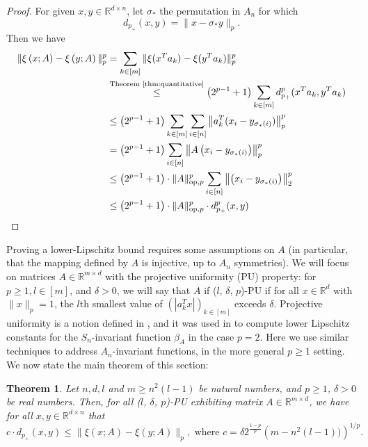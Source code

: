 \documentclass{amsart}
\theoremstyle{plain}
\newtheorem{theorem}{Theorem}
\theoremstyle{definition}
\theoremstyle{remark}
\newcommand{\RR}{\mathbb{R}}
\newcommand{\abs}[1]{\left\lvert#1\right\rvert}
\begin{document}
\begin{proof}
For given $x,y\in \RR^{d\times n}$, let $\sigma_\ast$ the permutation in $A_n$ for which 
\begin{equation}
   d_{p_+}(x,y)=\|x-\sigma_\ast y\|_p . 
\end{equation}
Then we have 
\begin{equation}
    \begin{split}
        \|\xi\left(x ; A \right) - \xi\left(y ; A \right)\|^p_p &=   \sum_{k\in [m]} \|\xi(x^Ta_k)-\xi(y^Ta_k) \|_p^p \\
        &\stackrel{\text{Theorem \ref{thm:quantitative}}}{\leq} \left(2^{p - 1} + 1 \right)  \sum_{k \in [m]}{d^p_{p_+}(x^Ta_k, y^Ta_k)}  \\
        &\leq \left(2^{p - 1} + 1 \right)  \sum_{k \in [m]}{\sum_{i \in [n]}{\left\|a_k^T(x_i-y_{\sigma_\ast(i)}) \right\|_p^p}}  \\
        &= \left(2^{p - 1} + 1 \right) \sum_{i \in [n]}{\left\|A\left( x_i - y_{\sigma_\ast(i)} \right) \right\|^p_p}  \\
&\leq \left(2^{p - 1} + 1 \right) \cdot \|A\|_{\text{op},p}^p
\sum_{i \in [n]}{\left\|\left( x_i - y_{\sigma_\ast(i)} \right) \right\|^p_2}  \\
& \leq \left(2^{p - 1} + 1 \right) \cdot  \|A\|_{\text{op},p}^p \cdot d^p_{p_+}(x, y)
\end{split}
\end{equation}
\end{proof}
Proving a lower-Lipschitz bound requires some assumptions on $A$ (in particular, that the mapping defined by $A$ is injective, up to $A_n$ symmetries). We will focus on matrices $A \in \RR^{m \times d}$ with the {projective uniformity (PU)} property: for $p\geq 1, l \in [m]$, and $\delta > 0$,  we will say that $A$  if ($l$, $\delta$, $p$)-PU if for all $x \in \RR^d$ with $\|x\|_p = 1$, the $l$th smallest value of $\left(\abs{a_k^T x} \right)_{k \in [m]}$ exceeds $\delta$. Projective uniformity is a notion defined in \cites{Cahill2025, doi:10.1137/12089939X}, and it was used in \cite{dym2025quantitativeboundssortingbasedpermutationinvariant} to compute lower Lipschitz constants for the $S_n$-invariant function $\beta_A$ in the case $p=2$. Here we use similar techniques to address $A_n$-invariant functions, in the more general $p\geq 1$ setting. We now state the main theorem of this section:
\begin{theorem} \label{theorem:F_a_bl_lower}
    Let $n, d, l$ and $m \geq n^2(l-1)$ be natural numbers, and $p \geq 1$, $\delta > 0$ be real numbers. Then, for all ($l$, $\delta$, $p$)-PU exhibiting matrix $A \in \RR^{m \times d}$, we have for all $x, y \in \RR^{d \times n}$ that 
    \begin{equation}
        c \cdot d_{p_+}(x, y) \leq \|\xi\left(x ; A \right) - \xi\left(y ; A \right)\|_p, \text{ where }  c =\delta2^{\frac{1-p}{p}} \left(m-n^2(l-1))\right)^{1/p}.
    \end{equation}
\end{theorem}
\end{document}

